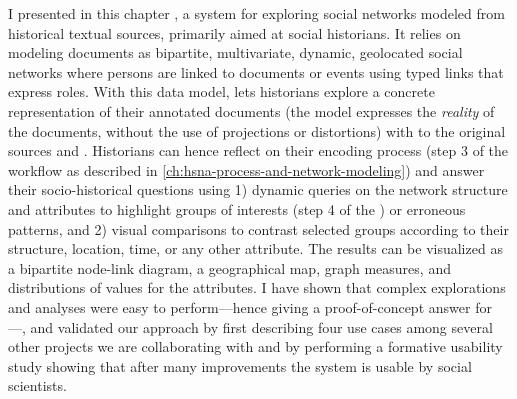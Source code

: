 I presented in this chapter \name, a \va system for exploring social networks modeled from historical textual sources, primarily aimed at social historians.
It relies on modeling documents as bipartite, multivariate, dynamic, geolocated social networks where persons are linked to documents or events using typed links that express roles.
With this data model, \name lets historians explore a concrete representation of their annotated documents (\ie the model expresses the \emph{reality} of the documents, without the use of projections or distortions) with \traceability to the original sources and \simplicity.
Historians can hence reflect on their encoding process (step 3 of the \hsna workflow as described in \autoref{ch:hsna-process-and-network-modeling}) and answer their socio-historical questions using 1) dynamic queries on the network structure and attributes to highlight groups of interests (step 4 of the \hsna) or erroneous patterns, and 2) visual comparisons to contrast selected groups according to their structure, location, time, or any other attribute.
The results can be visualized as a bipartite node-link diagram, a geographical map, graph measures, and distributions of values for the attributes.
I have shown that complex explorations and analyses were easy to perform---hence giving a proof-of-concept answer for \qtwo---, and validated our approach by first describing four use cases among several other projects we are collaborating with and by performing a formative usability study showing that after many improvements the system is usable by social scientists.

